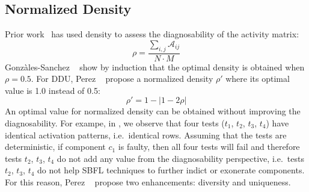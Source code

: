 \documentclass[twoside,a4paper,11pt]{memoir}
\begin{document}
\subsection{Normalized Density}
Prior work~\cite{5954476} has used density to assess the diagnosability of the activity matrix:
\begin{equation}
  \rho = \frac{\sum_{i,j}\mathcal{A}_{ij}}{N \cdot M}
\end{equation}
Gonz\`ales-Sanchez \etal~\cite{5954476} show by induction that the optimal density is obtained when \(\rho = 0.5 \).
For DDU, Perez \etal~\cite{DBLP:conf/icse/PerezAD17} propose a normalized density \(\rho' \) where its optimal value is 1.0 instead of 0.5:
\begin{equation}
  \rho' = 1 - | 1 - 2 \rho |
\end{equation}
An optimal value for normalized density can be obtained without improving the diagnosability.
For exampe, in , we observe that four tests (\(t_1\), \(t_2\), \(t_3\), \(t_4\)) have identical activation patterns, i.e.\ identical rows.
Assuming that the tests are deterministic, if component \(c_1\) is faulty, then all four tests will fail and therefore tests \(t_2\), \(t_3\), \(t_4\) do not add any value from the diagnosability perspective, i.e.\ tests \(t_2\), \(t_3\), \(t_4\) do not help SBFL techniques to further indict or exonerate components.
For this reason, Perez \etal~\cite{DBLP:conf/icse/PerezAD17} propose two enhancements: diversity and uniqueness.
\end{document}

